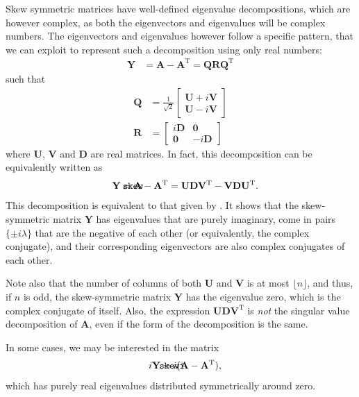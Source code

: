 \documentclass{article}
\def\mathnote#1{%
  \tag*{\rlap{\hspace\marginparsep\smash{\parbox[t]{\marginparwidth}{#1}}}}
}
\begin{document}
Skew symmetric matrices have well-defined eigenvalue decompositions,
which are however complex, as both the eigenvectors and eigenvalues will
be complex numbers.  The eigenvectors and eigenvalues however follow a
specific pattern, that we can exploit to represent such a decomposition
using only real numbers:
\begin{align}
  \mathbf Y &= \mathbf A - \mathbf A^{\mathrm T} = \mathbf Q \mathbf R \mathbf Q^{\mathrm T}
\end{align}
such that
\begin{align}
  \mathbf Q &= \frac 1 {\sqrt{2}} \left[
    \begin{array}{cc}
      \mathbf U + i \mathbf V \\
      \mathbf U - i \mathbf V 
    \end{array}
    \right] \\
  \mathbf R &= \left[ \begin{array}{cc}
      i \mathbf D & \mathbf 0 \\
      \mathbf 0 & -i \mathbf D
    \end{array} \right]
\end{align}
where $\mathbf U$, $\mathbf V$ and $\mathbf D$ are real matrices.  In
fact, this decomposition can be equivalently written as
\begin{align}
  \mathnote{\texttt{skew}}
  \mathbf Y = \mathbf A - \mathbf A^{\mathrm T} &=
  \mathbf U \mathbf D \mathbf V^{\mathrm T} - \mathbf V \mathbf D \mathbf U^{\mathrm T}.
\end{align}
This decomposition is equivalent to that given by 
\cite{b869}.  It shows that the skew-symmetric matrix $\mathbf Y$ has
eigenvalues that are purely imaginary, come  
in pairs $\{\pm i \lambda\}$ that are the negative of each other (or
equivalently, the complex conjugate), and their corresponding
eigenvectors are also complex conjugates of each other.

Note also that the number of columns of both $\mathbf U$ and $\mathbf V$
is at most $\lfloor n \rfloor$, and thus, if $n$ is odd, the
skew-symmetric matrix $\mathbf Y$ has the
eigenvalue zero, which is the complex conjugate of itself.  Also, the
expression $\mathbf U \mathbf D \mathbf V^{\mathrm T}$ is \emph{not} the
singular value decomposition of $\mathbf A$, even if the form of the
decomposition is the same. 

In some cases, we may be interested in the matrix
\begin{align*}
  \mathnote{\texttt{skewi}}
  i \mathbf Y &= i ( \mathbf A - \mathbf A^{\mathrm T} ),
\end{align*}
which has purely real eigenvalues distributed symmetrically around
zero. 
\end{document}
